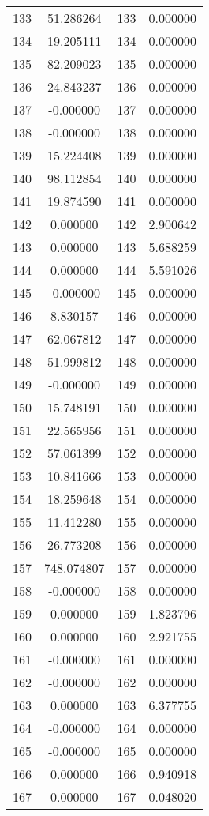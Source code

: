 \documentclass[12pt]{article}
\begin{document}
\begin{longtable}{@{}cccc@{}}
133 & 51.286264 & 133 & 0.000000 \\
134 & 19.205111 & 134 & 0.000000 \\
135 & 82.209023 & 135 & 0.000000 \\
136 & 24.843237 & 136 & 0.000000 \\
137 & -0.000000 & 137 & 0.000000 \\
138 & -0.000000 & 138 & 0.000000 \\
139 & 15.224408 & 139 & 0.000000 \\
140 & 98.112854 & 140 & 0.000000 \\
141 & 19.874590 & 141 & 0.000000 \\
142 & 0.000000 & 142 & 2.900642 \\
143 & 0.000000 & 143 & 5.688259 \\
144 & 0.000000 & 144 & 5.591026 \\
145 & -0.000000 & 145 & 0.000000 \\
146 & 8.830157 & 146 & 0.000000 \\
147 & 62.067812 & 147 & 0.000000 \\
148 & 51.999812 & 148 & 0.000000 \\
149 & -0.000000 & 149 & 0.000000 \\
150 & 15.748191 & 150 & 0.000000 \\
151 & 22.565956 & 151 & 0.000000 \\
152 & 57.061399 & 152 & 0.000000 \\
153 & 10.841666 & 153 & 0.000000 \\
154 & 18.259648 & 154 & 0.000000 \\
155 & 11.412280 & 155 & 0.000000 \\
156 & 26.773208 & 156 & 0.000000 \\
157 & 748.074807 & 157 & 0.000000 \\
158 & -0.000000 & 158 & 0.000000 \\
159 & 0.000000 & 159 & 1.823796 \\
160 & 0.000000 & 160 & 2.921755 \\
161 & -0.000000 & 161 & 0.000000 \\
162 & -0.000000 & 162 & 0.000000 \\
163 & 0.000000 & 163 & 6.377755 \\
164 & -0.000000 & 164 & 0.000000 \\
165 & -0.000000 & 165 & 0.000000 \\
166 & 0.000000 & 166 & 0.940918 \\
167 & 0.000000 & 167 & 0.048020 \\

\end{longtable}
\end{document}
